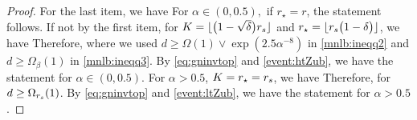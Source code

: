 \begin{proof}
For the last item, we have
For $\alpha \in (0,0.5),$  if $r_{\star} = r$, the statement follows. If not by the first item,  for  $K =   \lfloor  \big(1 - \sqrt{\delta}  \big) r_s\rfloor$  and $r_{\star} =   \lfloor  r_s \big(1 -  \delta  \big)\rfloor$, we have
Therefore,
where we used $d \geq \Omega(1) \vee \exp(2.5 \alpha^{-8})$ in \eqref{mnlb:ineqq2} and  $ d \geq \Omega_{\beta}(1)$ in \eqref{mnlb:ineqq3}. By \eqref{eq:gninvtop} and \ref{event:htZub}, we have the statement for $\alpha \in (0,0.5)$.  For $\alpha > 0.5$,    $K =  r_{\star} =   r_s$, we have
 Therefore,
for $d \geq \Omega_{r_s}(1)$.  By \eqref{eq:gninvtop} and   \ref{event:ltZub}, we have the statement for $\alpha > 0.5$.  
\end{proof}
 

